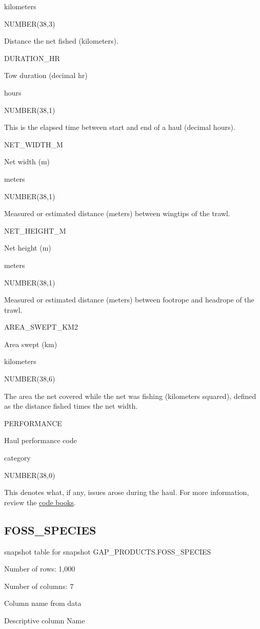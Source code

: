 \documentclass[
  letterpaper,
  oneside,
  open=any]{scrbook}
\begin{document}
kilometers

NUMBER(38,3)

Distance the net fished (kilometers).

DURATION\_HR

Tow duration (decimal hr)

hours

NUMBER(38,1)

This is the elapsed time between start and end of a haul (decimal
hours).

NET\_WIDTH\_M

Net width (m)

meters

NUMBER(38,1)

Measured or estimated distance (meters) between wingtips of the trawl.

NET\_HEIGHT\_M

Net height (m)

meters

NUMBER(38,1)

Measured or estimated distance (meters) between footrope and headrope of
the trawl.

AREA\_SWEPT\_KM2

Area swept (km)

kilometers

NUMBER(38,6)

The area the net covered while the net was fishing (kilometers squared),
defined as the distance fished times the net width.

PERFORMANCE

Haul performance code

category

NUMBER(38,0)

This denotes what, if any, issues arose during the haul. For more
information, review the
\href{https://www.fisheries.noaa.gov/resource/document/groundfish-survey-species-code-manual-and-data-codes-manual}{code
books}.

\subsection{FOSS\_SPECIES}\label{foss_species}

snapshot table for snapshot GAP\_PRODUCTS.FOSS\_SPECIES

Number of rows: 1,000

Number of columns: 7

Column name from data

Descriptive column Name
\end{document}
